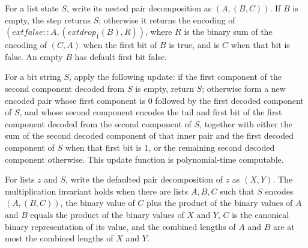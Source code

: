 \begin{definition}
\label{Complexity.BinArith.mulStep}
\leanok
{}
For a list state $S$, write its nested pair decomposition as $(A,(B,C))$. If $B$ is
empty, the step returns $S$; otherwise it returns the encoding of $(	ext{false} ::
A,(	ext{drop}_1(B),R))$, where $R$ is the binary sum of the encoding of $(C,A)$ when the
first bit of $B$ is true, and is $C$ when that bit is false. An empty $B$ has default
first bit false.
\end{definition}

\begin{theorem}
\label{Complexity.BinArith.polyTimeComputable_mulStep}
\leanok
{}
For a bit string $S$, apply the following update: if the first component of the second
component decoded from $S$ is empty, return $S$; otherwise form a new encoded pair whose
first component is $0$ followed by the first decoded component of $S$, and whose second
component encodes the tail and first bit of the first component decoded from the second
component of $S$, together with either the sum of the second decoded component of that
inner pair and the first decoded component of $S$ when that first bit is $1$, or the
remaining second decoded component otherwise. This update function is polynomial-time
computable.
\end{theorem}

\begin{definition}
\label{Complexity.BinArith.MulInv}
\leanok
{}
For lists $z$ and $S$, write the defaulted pair decomposition of $z$ as $(X,Y)$. The
multiplication invariant holds when there are lists $A,B,C$ such that $S$ encodes
$(A,(B,C))$, the binary value of $C$ plus the product of the binary values of $A$ and
$B$ equals the product of the binary values of $X$ and $Y$, $C$ is the canonical binary
representation of its value, and the combined lengths of $A$ and $B$ are at most the
combined lengths of $X$ and $Y$.
\end{definition}


